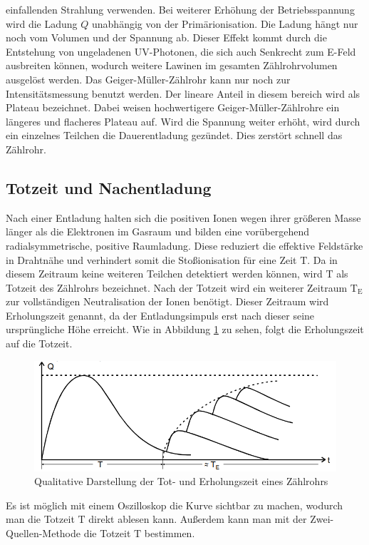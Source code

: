 einfallenden Strahlung verwenden.
Bei weiterer Erhöhung der Betriebsspannung wird die Ladung $Q$ unabhängig von der Primärionisation. 
Die Ladung hängt nur noch vom Volumen und der Spannung ab. Dieser Effekt kommt durch die Entstehung von ungeladenen UV-Photonen, die sich auch Senkrecht zum E-Feld
ausbreiten können, wodurch weitere Lawinen im gesamten Zählrohrvolumen ausgelöst werden. 
Das Geiger-Müller-Zählrohr kann nur noch zur Intensitätsmessung benutzt werden.
Der lineare Anteil in diesem bereich wird als Plateau bezeichnet. Dabei weisen hochwertigere Geiger-Müller-Zählrohre ein längeres und flacheres Plateau auf.
Wird die Spannung weiter erhöht, wird durch ein einzelnes Teilchen die Dauerentladung gezündet. Dies zerstört schnell das Zählrohr.
\subsection{Totzeit und Nachentladung}
Nach einer Entladung halten sich die positiven Ionen wegen ihrer größeren Masse länger als die Elektronen im Gasraum
und bilden eine vorübergehend radialsymmetrische, positive Raumladung.
Diese reduziert die effektive Feldstärke in Drahtnähe und verhindert somit die Stoßionisation für eine Zeit $\text{T}$.
Da in diesem Zeitraum keine weiteren Teilchen detektiert werden können, wird $\text{T}$ als Totzeit des Zählrohrs bezeichnet.
Nach der Totzeit wird ein weiterer Zeitraum $\text{T}_\text{E}$ zur vollständigen Neutralisation der Ionen benötigt.
Dieser Zeitraum wird Erholungszeit genannt, da der Entladungsimpuls erst nach dieser seine ursprüngliche Höhe erreicht.
Wie in Abbildung \ref{fig:tot} zu sehen, folgt die Erholungszeit auf die Totzeit.
\begin{figure}
  \centering
  \includegraphics[scale=0.6]{pics/totzeit.png}
  \caption{Qualitative Darstellung der Tot- und Erholungszeit eines Zählrohrs}
  \label{fig:tot}
\end{figure}
Es ist möglich mit einem Oszilloskop die Kurve sichtbar zu machen, wodurch man die Totzeit $\text{T}$ direkt ablesen kann.
Außerdem kann man mit der Zwei-Quellen-Methode die Totzeit $\text{T}$ bestimmen. 
